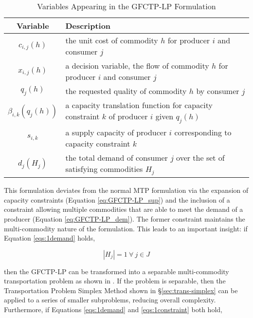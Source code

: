 \begin{table} [h!]
\centering
\begin{tabularx}{\textwidth-20pt}{|c|X|} %
\hline
Variable    & Description \\
\hline
$c_{i,j}(h)$             & the unit cost of commodity $h$ 
                         for producer $i$ and consumer $j$  \\
$x_{i,j}(h)$             & a decision variable, the flow of commodity $h$ 
                         for producer $i$ and consumer $j$  \\
$q_{j}(h)$               & the requested quality of commodity $h$ 
                         by consumer $j$  \\
$\beta_{i,k}(q_{j}(h))$  & a capacity translation function for capacity 
                         constraint $k$ of producer $i$ given $q_{j}(h)$ \\
$s_{i,k}$                & a supply capacity of producer $i$ corresponding to 
                         capacity constraint $k$ \\
$d_{j}(H_{j})$           & the total demand of consumer $j$ over the set of 
                         satisfying commodities $H_{j}$ \\
\hline
\end{tabularx}
\caption{Variables Appearing in the GFCTP-LP Formulation}
\label{tbl:GFCTP-LP-vars}
\end{table}

This formulation deviates from the normal MTP formulation via the expansion of
capacity constraints (Equation \ref{eq:GFCTP-LP_sup}) and the inclusion of a
constraint allowing multiple commodities that are able to meet the demand of a
producer (Equation \ref{eq:GFCTP-LP_dem}). The former constraint maintains the
multi-commodity nature of the formulation. This leads to an important insight: if
Equation \ref{eqs:1demand} holds,

\begin{equation}\label{eqs:1demand}
  \left|{H_{j}}\right| = 1 \: \forall \: j \in J
\end{equation}

then the GFCTP-LP can be transformed into a separable multi-commodity
transportation problem as shown in \cite{bertsekas_network_1998}. If the problem
is separable, then the Transportation Problem Simplex Method shown in
\S\ref{sec:trans-simplex} can be applied to a series of smaller subproblems,
reducing overall complexity. Furthermore, if Equations \ref{eqs:1demand} and
\ref{eqs:1constraint} both hold,


